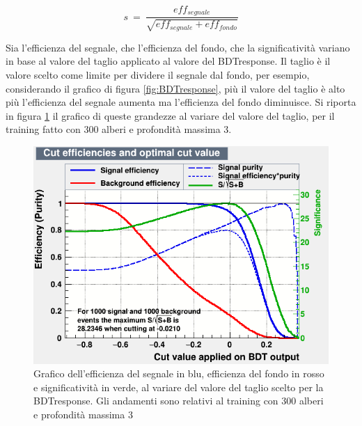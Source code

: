     \begin{equation}
        s \ = \ \frac{eff_{segnale}}{\sqrt{eff_{segnale} + eff_{fondo}}}
    \end{equation}{}

Sia l'efficienza del segnale, che l'efficienza del fondo, che la significatività variano in base al valore del taglio applicato al valore del BDTresponse. Il taglio è il valore scelto come limite per dividere il segnale dal fondo, per esempio, considerando il grafico di figura \ref{fig:BDTresponse}, più il valore del taglio è alto più l'efficienza del segnale aumenta ma l'efficienza del fondo diminuisce. Si riporta in figura \ref{fig:effBDT} il grafico di queste grandezze al variare del valore del taglio, per il training fatto con 300 alberi e profondità massima 3.
\\

    \begin{figure}[htbp] 
        \centering
        \includegraphics[width=0.7\linewidth]{training&testing/effBDT.png}
        \caption{Grafico dell'efficienza del segnale in blu, efficienza del fondo in rosso e significatività in verde, al variare del valore del taglio scelto per la BDTresponse. Gli andamenti sono relativi al training con 300 alberi e profondità massima 3}
        \label{fig:effBDT}
    \end{figure}
    
